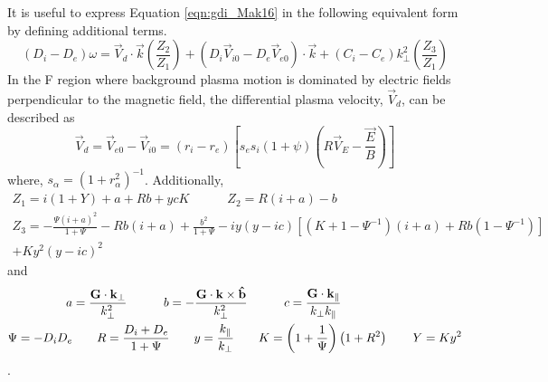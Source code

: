 It is useful to express Equation \ref{eqn:gdi_Mak16} in the following equivalent form by defining additional terms.
\begin{equation}
	\label{eqn:gdi_Mak16_alt}
	\left(D_i-D_e\right)\omega = \vec{V}_d\cdot\vec{k}\left(\frac{Z_2}{Z_1}\right) + \left(D_i\vec{V}_{i0}-D_e\vec{V}_{e0}\right)\cdot\vec{k}+(C_i-C_e)k_{\perp}^2\left(\frac{Z_3}{Z_1}\right)
\end{equation}
In the F region where background plasma motion is dominated by electric fields perpendicular to the magnetic field, the differential plasma velocity, \(\vec{V}_d\), can be described as 
\begin{equation}
	\label{eqn:gdi_Mak16_Vd}
	\vec{V}_d = \vec{V}_{e0}-\vec{V}_{i0} = (r_i-r_e)\left[s_es_i(1+\psi)\left(R\vec{V}_E-\frac{\vec{E}}{B}\right)\right]
\end{equation}
where, \(s_\alpha = (1+r_\alpha^2)^{-1}\).  Additionally,
\begin{equation}
\label{eqn:gdi_Mak16_Z}
\begin{split}
	Z_1 = i(1+Y)+a+Rb+ycK \quad\quad\quad 
	Z_2 = R(i+a)-b \quad\quad\quad\quad\quad\quad\\
	Z_3 = -\frac{\Psi(i+a)^2}{1+\Psi}-Rb(i+a)+\frac{b^2}{1+\Psi}-iy(y-ic)\left[\left(K+1-\Psi^{-1}\right)(i+a)+Rb\left(1-\Psi^{-1}\right)\right]\\+Ky^2(y-ic)^2
\end{split}
\end{equation}
and
\begin{equation}
\begin{split}
	a& = \frac{\mathbf{G}\cdot\mathbf{k}_\perp}{k_\perp^2} \quad\quad\quad
	b = -\frac{\mathbf{G}\cdot\mathbf{k}\times\mathbf{\hat{b}}}{k_\perp^2} \quad\quad\quad
	c = \frac{\mathbf{G}\cdot\mathbf{k}_\parallel}{k_\perp k_\parallel} \\
	\Psi = -D_iD_e& \quad\quad
	R = \frac{D_i+D_e}{1+\Psi} \quad\quad
	y = \frac{k_\parallel}{k_\perp} \quad\quad
	K = \left(1+\frac{1}{\Psi}\right)\left(1+R^2\right) \quad\quad
	Y = Ky^2
\end{split}
\end{equation}.

